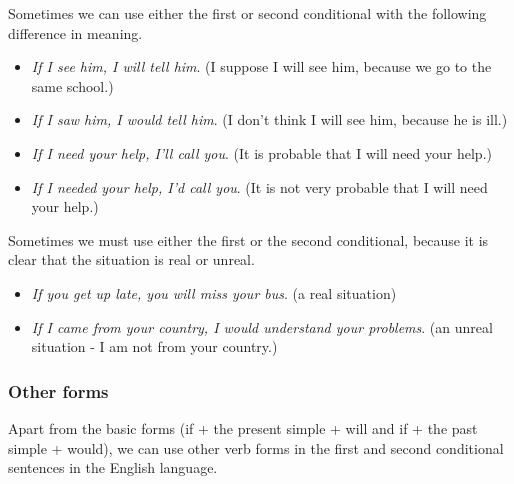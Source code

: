 Sometimes we can use either the first or second conditional with the following difference in meaning.

\begin{itemize}

\item \textit{If I see him, I will tell him}. (I suppose I will see him, because we go to the same school.)
\item \textit{If I saw him, I would tell him}. (I don't think I will see him, because he is ill.)
\item \textit{If I need your help, I'll call you}. (It is probable that I will need your help.) 
\item \textit{If I needed your help, I'd call you}. (It is not very probable that I will need your help.)

\end{itemize}

Sometimes we must use either the first or the second conditional, because it is clear that the situation is real or unreal. 

\begin{itemize}

\item \textit{If you get up late, you will miss your bus}. (a real situation)
\item \textit{If I came from your country, I would understand your problems}.  (an unreal situation - I am not from your country.)

\end{itemize}

\subsubsection{Other forms}

Apart from the basic forms (if  + the present simple + will and if + the past simple + would), we can use other verb forms in the first and second conditional sentences in the English language.

